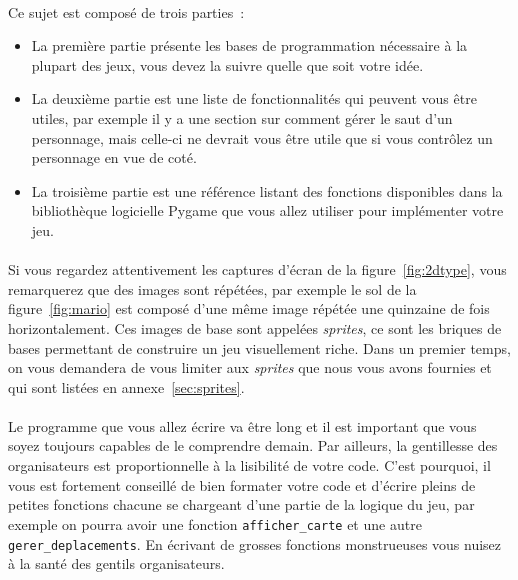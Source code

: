 \paragraph{}
Ce sujet est composé de trois parties~:
\begin{itemize}
	\item La première partie présente les bases de programmation nécessaire à la plupart des jeux, vous devez la suivre quelle que soit votre idée.
	\item La deuxième partie est une liste de fonctionnalités qui peuvent vous être utiles, par exemple il y a une section sur comment gérer le saut d'un personnage, mais celle-ci ne devrait vous être utile que si vous contrôlez un personnage en vue de coté.
	\item La troisième partie est une référence listant des fonctions disponibles dans la bibliothèque logicielle Pygame que vous allez utiliser pour implémenter votre jeu.
\end{itemize}

\paragraph{}
Si vous regardez attentivement les captures d'écran de la figure~\ref{fig:2dtype}, vous remarquerez que des images sont répétées, par exemple le sol de la figure~\ref{fig:mario} est composé d'une même image répétée une quinzaine de fois horizontalement.
Ces images de base sont appelées \emph{sprites}, ce sont les briques de bases permettant de construire un jeu visuellement riche.
Dans un premier temps, on vous demandera de vous limiter aux \emph{sprites} que nous vous avons fournies et qui sont listées en annexe~\ref{sec:sprites}.

\paragraph{}
Le programme que vous allez écrire va être long et il est important que vous soyez toujours capables de le comprendre demain.
Par ailleurs, la gentillesse des organisateurs est proportionnelle à la lisibilité de votre code.
C'est pourquoi, il vous est fortement conseillé de bien formater votre code et d'écrire pleins de petites fonctions chacune se chargeant d'une partie de la logique du jeu, par exemple on pourra avoir une fonction \texttt{afficher\_carte} et une autre \texttt{gerer\_deplacements}.
En écrivant de grosses fonctions monstrueuses vous nuisez à la santé des gentils organisateurs.

